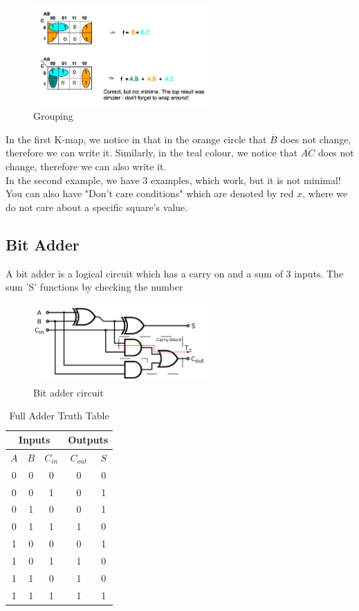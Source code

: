\documentclass[a4paper]{article}
\theoremstyle{plain}
\theoremstyle{definition}
\theoremstyle{remark}
\begin{document}
\begin{figure}[H]
	\centering
	\includegraphics[width=0.6\textwidth]{figures/k4.png}
	\caption{Grouping}
	\label{fig:figures-k4-png}
\end{figure}	
In the first K-map, we notice in that in the orange circle that $\overline{B}$ does not change, therefore we can write it. Similarly, in the teal colour, we notice that $\overline{AC}$ does not change, therefore we can also write it. \\
In the second example, we have 3 examples, which work, but it is not minimal! \\
You can also have "Don't care conditions" which are denoted by red $x$, where we do not care about a specific square's value.
\subsection{Bit Adder}
A bit adder is a logical circuit which has a carry on and a sum of 3 inputs. The sum 'S' functions by checking the number 
\begin{figure}[H]
	\centering
	\includegraphics[width=0.6\textwidth]{figures/bitadder.png}
	\caption{Bit adder circuit}
	\label{fig:adder}
\end{figure}
\begin{table}[H]
	\centering
	\caption{Full Adder Truth Table}
	\label{tab:addertable}
	\begin{tabular}{c|c|c|c|c}
	\multicolumn{3}{c|}{Inputs} & \multicolumn{2}{c}{Outputs}\\
	\hline
	$A$ & $B$ & $C _{in}$ & $C_{out}$ & $S$ \\
	\hline
	0 & 0 & 0 & 0 & 0 \\
	0 & 0 & 1 & 0 & 1 \\
	0 & 1 & 0 & 0 & 1 \\
	0 & 1 & 1 & 1 & 0 \\
	1 & 0 & 0 & 0 & 1 \\
	1 & 0 & 1 & 1 & 0 \\
	1 & 1 & 0 & 1 & 0 \\
	1 & 1 & 1 & 1 & 1 \\
	\hline
	\end{tabular}
\end{table}
\end{document}
